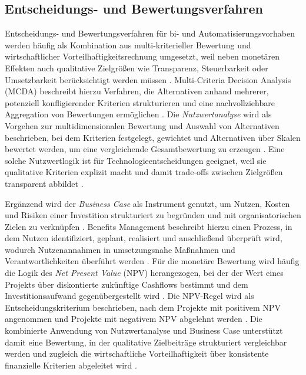\subsection{Entscheidungs- und Bewertungsverfahren}
Entscheidungs- und Bewertungsverfahren für \gls{bi}- und Automatisierungsvorhaben werden häufig als Kombination aus multi-kriterieller Bewertung und wirtschaftlicher Vorteilhaftigkeitsrechnung umgesetzt, weil neben monetären Effekten auch qualitative Zielgrößen wie Transparenz, Steuerbarkeit oder Umsetzbarkeit berücksichtigt werden müssen \cite{BeltonStewart2002MCDA,Zangemeister1976Nutzwertanalyse}. 
Multi-Criteria Decision Analysis (MCDA) beschreibt hierzu Verfahren, die Alternativen anhand mehrerer, potenziell konfligierender Kriterien strukturieren und eine nachvollziehbare Aggregation von Bewertungen ermöglichen \cite{BeltonStewart2002MCDA,KeeneyRaiffa1976DMO}. 
Die \emph{Nutzwertanalyse} wird als Vorgehen zur multidimensionalen Bewertung und Auswahl von Alternativen beschrieben, bei dem Kriterien festgelegt, gewichtet und Alternativen über Skalen bewertet werden, um eine vergleichende Gesamtbewertung zu erzeugen \cite{Zangemeister1976Nutzwertanalyse}. 
Eine solche Nutzwertlogik ist für Technologieentscheidungen geeignet, weil sie qualitative Kriterien explizit macht und damit trade-offs zwischen Zielgrößen transparent abbildet \cite{BeltonStewart2002MCDA,KeeneyRaiffa1976DMO}. 

Ergänzend wird der \emph{Business Case} als Instrument genutzt, um Nutzen, Kosten und Risiken einer Investition strukturiert zu begründen und mit organisatorischen Zielen zu verknüpfen \cite{WardDaniel2006Benefits}. 
Benefits Management beschreibt hierzu einen Prozess, in dem Nutzen identifiziert, geplant, realisiert und anschließend überprüft wird, wodurch Nutzenannahmen in umsetzungsnahe Maßnahmen und Verantwortlichkeiten überführt werden \cite{WardDaniel2006Benefits}. 
Für die monetäre Bewertung wird häufig die Logik des \emph{Net Present Value} (NPV) herangezogen, bei der der Wert eines Projekts über diskontierte zukünftige Cashflows bestimmt und dem Investitionsaufwand gegenübergestellt wird \cite{BrealeyMyersAllenCh5NPV}. 
Die NPV-Regel wird als Entscheidungskriterium beschrieben, nach dem Projekte mit positivem NPV angenommen und Projekte mit negativem NPV abgelehnt werden \cite{BrealeyMyersAllenCh5NPV}. 
Die kombinierte Anwendung von Nutzwertanalyse und Business Case unterstützt damit eine Bewertung, in der qualitative Zielbeiträge strukturiert vergleichbar werden und zugleich die wirtschaftliche Vorteilhaftigkeit über konsistente finanzielle Kriterien abgeleitet wird \cite{Zangemeister1976Nutzwertanalyse,WardDaniel2006Benefits,BrealeyMyersAllenCh5NPV}. 


